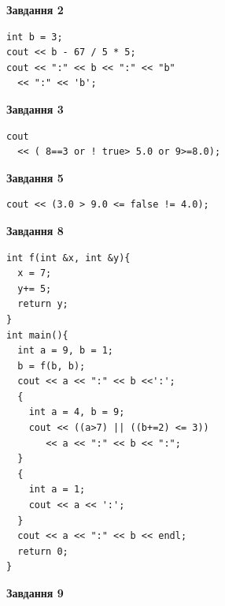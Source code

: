 \documentclass[12pt, ukrainian]{article}
\begin{document}
{\begin {large}
\begin{minipage}[t]{7.0cm}
\end{minipage}
\vline \hspace{1mm}
\begin{minipage}[t]{11.0cm}

\begin{center}
\textbf{Завдання 2}
\end{center}
\vspace{-8mm}

\begin{verbatim}
int b = 3;
cout << b - 67 / 5 * 5;
cout << ":" << b << ":" << "b" 
  << ":" << 'b';
\end{verbatim}



\begin{center}
\textbf{Завдання 3}
\end{center}
\vspace{-8mm}

\begin{verbatim}
cout 
  << ( 8==3 or ! true> 5.0 or 9>=8.0);
\end{verbatim}



\begin{center}
\textbf{Завдання 5}
\end{center}
\vspace{-8mm}

\begin{verbatim}
cout << (3.0 > 9.0 <= false != 4.0);
\end{verbatim}



\begin{center}
\textbf{Завдання 8}
\end{center}
\vspace{-8mm}

\begin{verbatim}
int f(int &x, int &y){
  x = 7;
  y+= 5;
  return y;
}
int main(){
  int a = 9, b = 1;
  b = f(b, b);
  cout << a << ":" << b <<':';
  {
    int a = 4, b = 9;
    cout << ((a>7) || ((b+=2) <= 3))
       << a << ":" << b << ":";
  }
  {
    int a = 1;
    cout << a << ':';
  }
  cout << a << ":" << b << endl;
  return 0;
}
\end{verbatim}

\end{minipage}


\begin{minipage}[t]{7.0cm}

\begin{center}
\textbf{Завдання 9}
\end{center}
\vspace{-8mm}


\end{minipage}
\end{large}}
\end{document}

